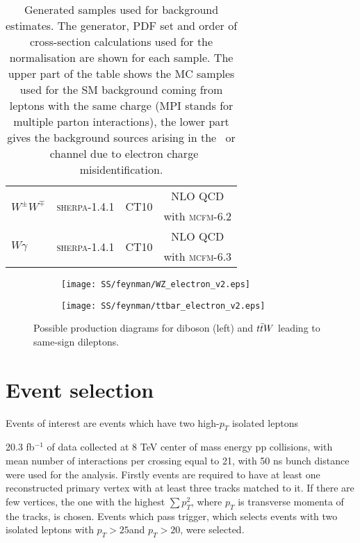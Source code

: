 \begin{table}[ht]
\begin{center}
\begin{tabular}{l|c|c|c}
\multirow{2}{*}{$W^{\pm}W^{\mp}$} & \multirow{2}{*}{{\scshape sherpa-1.4.1}} & \multirow{2}{*}{CT10}& NLO QCD \\
& &  & with {\scshape mcfm-6.2}\\
\hline
\multirow{2}{*}{$W\gamma$} & \multirow{2}{*}{{\scshape sherpa}-1.4.1} & \multirow{2}{*}{CT10}& NLO QCD\\
& &  & with {\scshape mcfm-6.3}\\
\hline
\end{tabular}
\end{center}
  \caption{Generated samples used for background estimates. The generator, PDF set and order of cross-section calculations used for the normalisation
  are shown for each sample.
  The upper part of the table shows the MC samples used for the SM background coming from leptons with the same charge (MPI stands for multiple parton interactions), the lower part gives the background sources arising in the \ee\ or \emu\ channel due to electron charge misidentification.}
\label{tab:MC_cross}
\end{table}

\begin{figure}

\begin{subfigure}{.5\textwidth}
  \centering
  \texttt{[image: SS/feynman/WZ\_electron\_v2.eps]}
\end{subfigure}%
\begin{subfigure}{.5\textwidth}
  \centering
  \texttt{[image: SS/feynman/ttbar\_electron\_v2.eps]}
\end{subfigure}

\caption{Possible production diagrams for diboson (left) and $t\bar{t} W$ leading to same-sign dileptons. }
  \label{fig:precHitFracPerTrack}
\end{figure}


\section{Event selection}


Events of interest are events which have two high-$p_T$ isolated leptons \toFix

20.3 fb$^{-1}$ of data collected at 8 TeV center of mass energy pp collisions, with mean number of interactions per crossing equal to 21, 
with 50 ns bunch distance were used for the analysis.
Firstly events are required to have at least one reconstructed primary vertex with at least three tracks matched to it. If there are few vertices, the one with the highest
$\sum p^2_T$, where $p_T$ is transverse momenta of the tracks, is chosen.
Events which pass \toFix trigger, which selects events with two isolated \toFix leptons with $p_{T}>25$\toFix and $p_{T}>20$\toFix, were selected.

